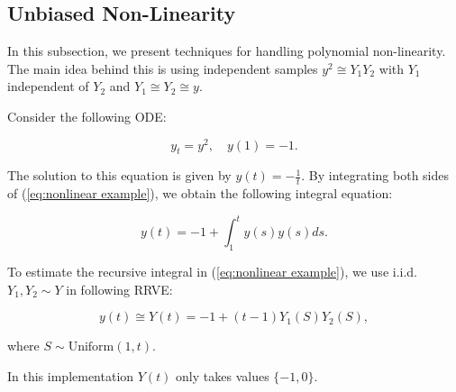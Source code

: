 \documentclass[a4paper,12pt]{article}
\begin{document}
\subsection{Unbiased Non-Linearity}

In this subsection, we present techniques for handling polynomial non-linearity.
The main idea behind this is using independent samples
$y^{2} \cong Y_{1} Y_{2}$ with $Y_{1}$ independent of $ Y_{2}$ and
$Y_{1} \cong Y_{2} \cong y$.


\begin{example}[$y_t=y^{2}$] \label{ex:nonlinear example}
    Consider the following ODE:

    \begin{equation} \label{eq:nonlinear example}
        y_t = y^2, \quad y(1) = -1.
    \end{equation}

    The solution to this equation is given by $y(t) = -\frac{1}{t}$.
    By integrating both sides of (\ref{eq:nonlinear example}),
    we obtain the following integral equation:

    \begin{equation}
        y(t) = -1 + \int_{1}^{t} y(s) y(s)ds.
    \end{equation}

    To estimate the recursive integral in (\ref{eq:nonlinear example}),
    we use i.i.d. $Y_1,Y_2 \sim Y$ in following RRVE:

    \begin{equation} \label{RRVE: nonlinear example}
        y(t) \cong Y(t) = -1 + (t-1) Y_1(S) Y_2(S),
    \end{equation}

    where $S \sim \text{Uniform}(1,t)$.
\end{example}

\vspace*{0.2cm}
\begin{pythonn}\label{py:nonlinear example}
    In this implementation $Y(t)$ only takes values $\{-1,0\}$.
\end{pythonn}
\end{document}
